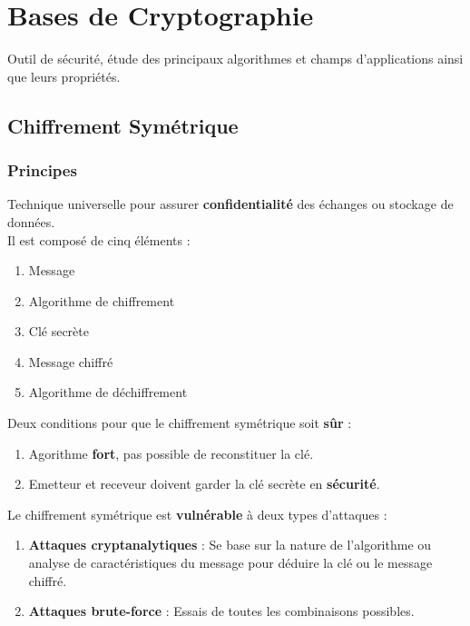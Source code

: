 \documentclass{report}
\begin{document}

\chapter{Bases de Cryptographie}

	Outil de sécurité, étude des principaux algorithmes et champs d'applications ainsi que leurs propriétés.\\

	\section{Chiffrement Symétrique}

		\subsection{Principes}

			Technique universelle pour assurer \textbf{confidentialité} des échanges ou stockage de données.\\

			Il est composé de cinq éléments : \\

			\begin{enumerate}
				\item Message
				\item Algorithme de chiffrement
				\item Clé secrète
				\item Message chiffré
				\item Algorithme de déchiffrement\\
			\end{enumerate}

			Deux conditions pour que le chiffrement symétrique soit \textbf{sûr} : \\

			\begin{enumerate}
				\item Agorithme \textbf{fort}, pas possible de reconstituer la clé.
				\item Emetteur et receveur doivent garder la clé secrète en \textbf{sécurité}.\\
			\end{enumerate}

			Le chiffrement symétrique est \textbf{vulnérable} à deux types d'attaques : \\

			\begin{enumerate}
				\item \textbf{Attaques cryptanalytiques} : Se base sur la nature de l'algorithme ou analyse de caractéristiques du message pour déduire la clé ou le message chiffré.\\
				\item \textbf{Attaques brute-force} : Essais de toutes les combinaisons possibles.\\
			\end{enumerate}
\end{document}
